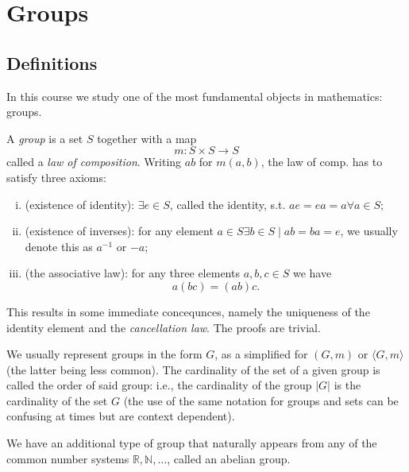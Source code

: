 \documentclass{article}
\begin{document}

\section{Groups}

\subsection{Definitions}

In this course we study one of the most fundamental objects in mathematics: groups. 

\begin{definition}
  A \textit{group} is a set \( S \) together with a map
  \begin{displaymath}
    m: S\times S \to  S
  \end{displaymath}
  called a \textit{law of composition}. Writing \( ab \) for \( m(a,b) \), the law of comp. has to satisfy three axioms:
  \begin{enumerate}[i.]
    \item (existence of identity): \( \exists e \in  S \), called the identity, s.t. \( ae=ea=a \forall a\in S \);
    \item (existence of inverses): for any element \( a \in S \exists b \in  S \mid  ab=ba=e\), we usually denote this as \( a^{-1} \) or \( -a \);
    \item (the associative law): for any three elements \( a,b,c \in  S \) we have \[
      a(bc)=(ab)c
    .\] 
  \end{enumerate}
\end{definition}

This results in some immediate concequnces, namely the uniqueness of the identity element and the \textit{cancellation law}. The proofs are trivial. 

We usually represent groups in the form \( G \), as a simplified for \( (G,m) \) or \( \langle G,m \rangle \) (the latter being less common). The cardinality of the set of a given group is called the order of said group: i.e., the cardinality of the group \( |G| \) is the cardinality of the set \( G \) (the use of the same notation for groups and sets can be confusing at times but are context dependent). 

We have an additional type of group that naturally appears from any of the common number systems \( \mathbb{R},\mathbb{N},\ldots  \), called an abelian group.
\end{document}
